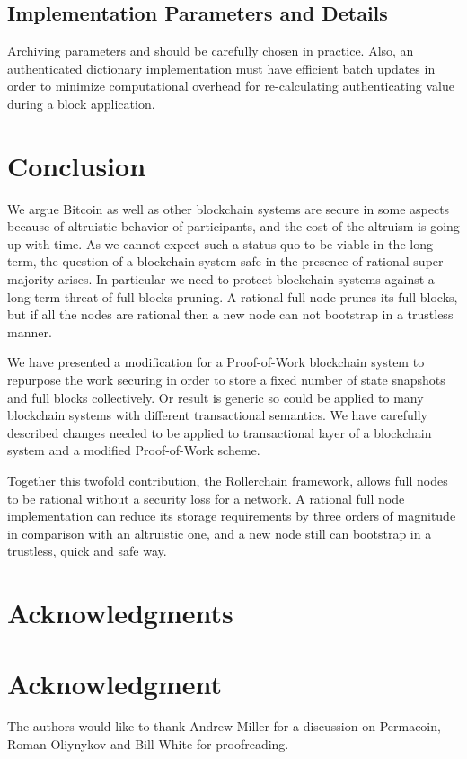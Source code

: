 \documentclass[conference,compsoc]{IEEEtran}
\begin{document}
\subsection{Implementation Parameters and Details}

Archiving parameters  and  should be carefully chosen in practice. Also, an authenticated dictionary implementation must have efficient batch updates in order to minimize computational overhead for re-calculating authenticating value during a block application.


\section{Conclusion}
\label{conclusion}

We argue Bitcoin as well as other blockchain systems are secure in some aspects because of altruistic behavior of participants, and the cost of the altruism is going up with time. As we cannot expect such a status quo to be viable in the long term, the question of a blockchain system safe in the presence of rational super-majority arises. In particular we need to protect blockchain systems against a long-term threat of full blocks pruning. A rational full node prunes its full blocks, but if all the nodes are rational then a new node can not bootstrap in a trustless manner. 

We have presented a modification for a Proof-of-Work blockchain system to repurpose the work securing in order to store a fixed number of state snapshots and full blocks collectively. Or result is generic so could be applied to many blockchain systems with different transactional semantics. We have carefully described changes needed to be applied to transactional layer of a blockchain system and a modified Proof-of-Work scheme. 

Together this twofold contribution, the Rollerchain framework, allows full nodes to be rational without a security loss for a network. A rational full node implementation can reduce its storage requirements by three orders of magnitude in comparison with an altruistic one, and a new node still can bootstrap in a trustless, quick and safe way.


\ifCLASSOPTIONcompsoc
\section*{Acknowledgments}
\else
\section*{Acknowledgment}
\fi

The authors would like to thank Andrew Miller for a discussion on Permacoin, Roman Oliynykov and Bill White for proofreading.




\newpage
\onecolumn
\end{document}
